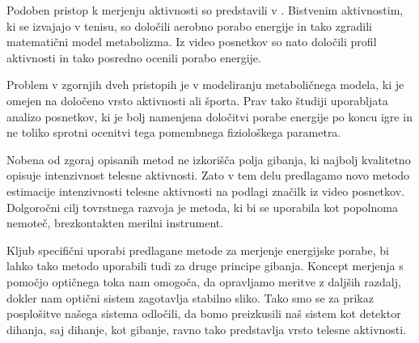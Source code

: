 Podoben pristop k merjenju aktivnosti so predstavili v \cite{botton2011energy}. Bistvenim aktivnostim, ki se izvajajo v tenisu, so določili aerobno porabo energije in tako zgradili matematični model metabolizma. Iz video posnetkov so nato določili profil aktivnosti in tako posredno ocenili porabo energije.

Problem v zgornjih dveh pristopih je v modeliranju metaboličnega modela, ki je omejen na določeno vrsto aktivnosti ali športa. Prav tako študiji uporabljata analizo posnetkov, ki je bolj namenjena določitvi porabe energije po koncu igre in ne toliko sprotni ocenitvi tega pomembnega fiziološkega parametra.

Nobena od zgoraj opisanih metod ne izkorišča polja gibanja, ki najbolj kvalitetno opisuje intenzivnost telesne aktivnosti. Zato v tem delu predlagamo novo metodo estimacije intenzivnosti telesne aktivnosti na podlagi značilk iz video posnetkov. Dolgoročni cilj tovrstnega razvoja je metoda, ki bi se uporabila kot popolnoma nemoteč, brezkontakten merilni instrument.

Kljub specifični uporabi predlagane metode za merjenje energijske porabe, bi lahko tako metodo uporabili tudi za druge principe gibanja. Koncept merjenja s pomočjo optičnega toka nam omogoča, da opravljamo meritve z daljših razdalj, dokler nam optični sistem zagotavlja stabilno sliko. Tako smo se za prikaz posplošitve našega sistema odločili, da bomo preizkusili naš sistem kot detektor dihanja, saj dihanje, kot gibanje, ravno tako predstavlja vrsto telesne aktivnosti.